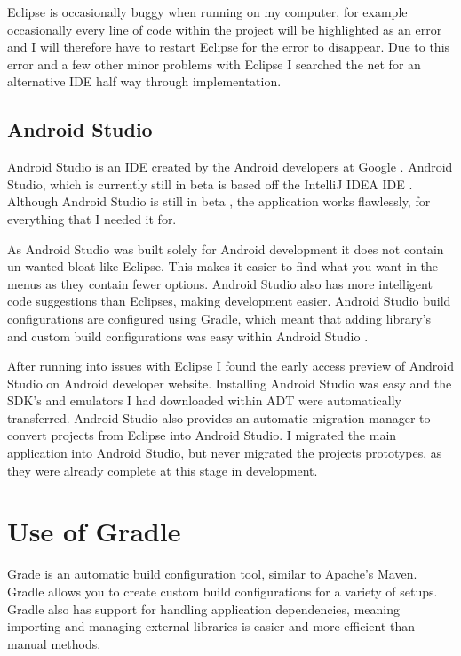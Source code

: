 Eclipse is occasionally buggy when running on my computer, for example occasionally every line of code within the project will be highlighted as an error and I will therefore have to restart Eclipse for the error to disappear. Due to this error and a few other minor problems with Eclipse I searched the net for an alternative IDE half way through implementation.


\subsection{Android Studio}

Android Studio is an IDE created by the Android developers at Google \cite{android_studio}. Android Studio, which is currently still in beta is based off the IntelliJ IDEA IDE \cite{android_studio}. Although Android Studio is still in beta \cite{android_studio}, the application works flawlessly, for everything that I needed it for.

As Android Studio was built solely for Android development it does not contain un-wanted  bloat like Eclipse. This makes it easier to find what you want in the menus as they contain fewer options. Android Studio also has more intelligent code suggestions than Eclipses, making development easier. Android Studio build configurations are configured using Gradle, which meant that adding library's and custom build configurations was easy within Android Studio \cite{android_studio}.

After running into issues with Eclipse I found the early access preview of Android Studio on Android developer website. Installing Android Studio was easy and the SDK's and emulators I had downloaded within ADT were automatically transferred. Android Studio also provides an automatic migration manager to convert projects from Eclipse into Android Studio. I migrated the main application into Android Studio, but never migrated the projects prototypes, as they were already complete at this stage in development.

\section{Use of Gradle}

Grade \cite{gradle} is an automatic build configuration tool, similar to Apache's Maven. Gradle allows you to create custom build configurations \cite{gradle} for a variety of setups. Gradle also has support for handling application dependencies, meaning importing and managing external libraries is easier and more efficient than manual methods.

